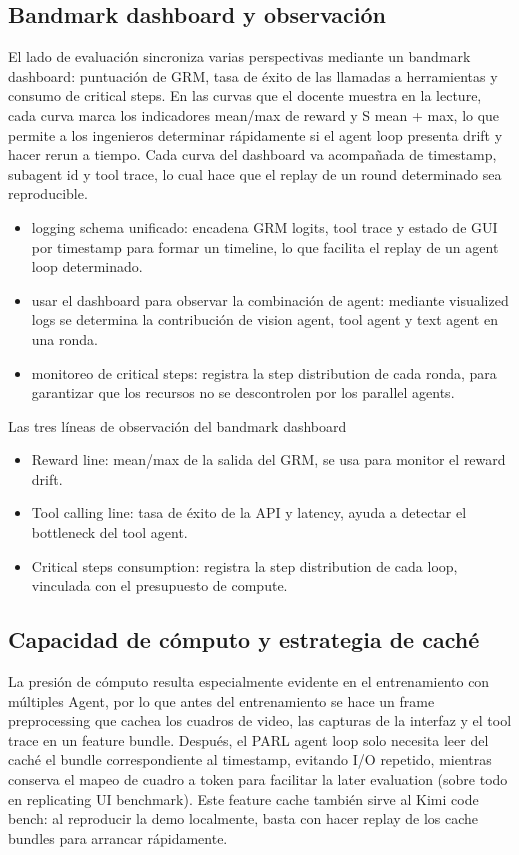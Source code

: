 \documentclass[a4paper]{article}
\begin{document}
\subsection{Bandmark dashboard y observación}
El lado de evaluación sincroniza varias perspectivas mediante un bandmark dashboard: puntuación de GRM, tasa de éxito de las llamadas a herramientas y consumo de critical steps. En las curvas que el docente muestra en la lecture, cada curva marca los indicadores mean/max de reward y S mean + max, lo que permite a los ingenieros determinar rápidamente si el agent loop presenta drift y hacer rerun a tiempo. Cada curva del dashboard va acompañada de timestamp, subagent id y tool trace, lo cual hace que el replay de un round determinado sea reproducible.
\begin{itemize}
    \item logging schema unificado: encadena GRM logits, tool trace y estado de GUI por timestamp para formar un timeline, lo que facilita el replay de un agent loop determinado.
    \item usar el dashboard para observar la combinación de agent: mediante visualized logs se determina la contribución de vision agent, tool agent y text agent en una ronda.
    \item monitoreo de critical steps: registra la step distribution de cada ronda, para garantizar que los recursos no se descontrolen por los parallel agents.
\end{itemize}

\begin{knowledgebox}{Las tres líneas de observación del bandmark dashboard}
\begin{itemize}
    \item Reward line: mean/max de la salida del GRM, se usa para monitor el reward drift.
    \item Tool calling line: tasa de éxito de la API y latency, ayuda a detectar el bottleneck del tool agent.
    \item Critical steps consumption: registra la step distribution de cada loop, vinculada con el presupuesto de compute.
\end{itemize}
\end{knowledgebox}

\subsection{Capacidad de cómputo y estrategia de caché}
La presión de cómputo resulta especialmente evidente en el entrenamiento con múltiples Agent, por lo que antes del entrenamiento se hace un frame preprocessing que cachea los cuadros de video, las capturas de la interfaz y el tool trace en un feature bundle. Después, el PARL agent loop solo necesita leer del caché el bundle correspondiente al timestamp, evitando I/O repetido, mientras conserva el mapeo de cuadro a token para facilitar la later evaluation (sobre todo en replicating UI benchmark). Este feature cache también sirve al Kimi code bench: al reproducir la demo localmente, basta con hacer replay de los cache bundles para arrancar rápidamente.
\end{document}
